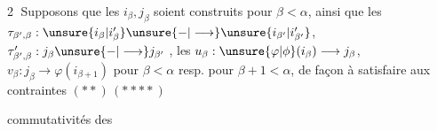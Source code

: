 
\textcircled{2} Supposons que les $i_\beta,j_\beta$ soient construits pour $\beta<\alpha$, ainsi que les $\tau_{\beta',\beta}:\unsure{i_\beta|i'_\beta}\unsure{-|\longrightarrow}\unsure{i_{\beta'}|i'_{\beta'}}$, $\tau'_{\beta',\beta}:j_\beta\unsure{-|\longrightarrow}j_{\beta'}$ ,  les $u_\beta:\unsure{\varphi|\phi}(i_\beta)\longrightarrow j_\beta$, $v_\beta:j_\beta\longrightarrow\varphi(i_{\beta+1})$  pour $\beta<\alpha$ resp. pour $\beta+1<\alpha$, de façon à satisfaire aux contraintes $(**)\,(****)$ 


commutativités des

